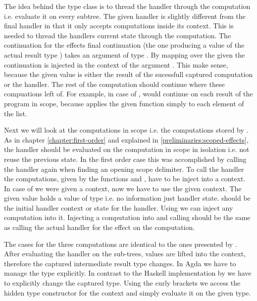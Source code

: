 The idea behind the  type class is to thread the handler
through the computation i.e. evaluate it on every subtree.
The given handler  is slightly different from the final
handler in that it only accepts computations inside its context.
This is needed to thread the handlers current state through the computation.
The continuation for the effects final continuation (the one producing a value
of the actual result type ) takes an argument of type
.
By mapping  over the given  the continuation is
injected in the context of the argument .
This make sense, because the given value is either the result of the sucessfull
captured computation or the handler.
The rest of the computation should continue where these compuations left of.
For example, in case of ,  would continue
on each result of the program in scope, because \AgdaFunction{<\$>} applies the
given function simply to each element of the list.

Next we will look at the computations in scope i.e. the computations stored by
.
As in chapter \ref{chapter:first-order} and explained in
\ref{preliminaries:scoped-effects}, the handler should be evaluated on the
computation in scope in isolation i.e. not reuse the previous state.
In the first order case this was accomplished by calling the handler again when
finding an opening scope delimiter.
To call the handler the computations, given by the functions 
and , have to be inject into a context.
In case of  we were given a context, now we have to use the
given context.
The given value  holds a value of type  i.e.
no information just handler state.
 should be the initial handler context or state for the
handler.
Using \AgdaFunction{<\$} we can inject any computation into it.
Injecting a computation into  and calling 
should be the same as calling the actual handler for the effect on the
computation.

The cases for the three computations are identical to the ones presented by
\citeauthor{DBLP:conf/haskell/WuSH14}.
After evaluating the handler on the sub-trees, values are lifted into the
context, therefore the captured intermediate result type changes.
In Agda we have to manage the type explicitly.
In contrast to the Haskell implementation by
\citeauthor{DBLP:conf/haskell/WuSH14} we have to explicitly change the captured
type.
Using the curly brackets we access the hidden type constructor 
for the context and simply evaluate it on the given type.

